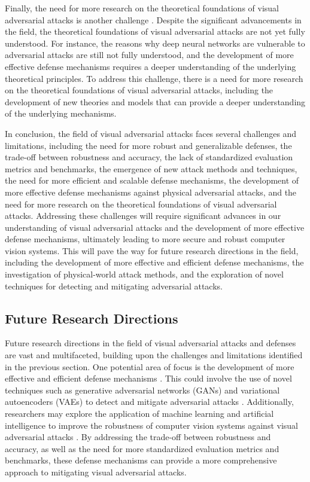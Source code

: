 \documentclass[11pt]{article}
\begin{document}
Finally, the need for more research on the theoretical foundations of visual adversarial attacks is another challenge \cite{ref134}. Despite the significant advancements in the field, the theoretical foundations of visual adversarial attacks are not yet fully understood. For instance, the reasons why deep neural networks are vulnerable to adversarial attacks are still not fully understood, and the development of more effective defense mechanisms requires a deeper understanding of the underlying theoretical principles. To address this challenge, there is a need for more research on the theoretical foundations of visual adversarial attacks, including the development of new theories and models that can provide a deeper understanding of the underlying mechanisms.

In conclusion, the field of visual adversarial attacks faces several challenges and limitations, including the need for more robust and generalizable defenses, the trade-off between robustness and accuracy, the lack of standardized evaluation metrics and benchmarks, the emergence of new attack methods and techniques, the need for more efficient and scalable defense mechanisms, the development of more effective defense mechanisms against physical adversarial attacks, and the need for more research on the theoretical foundations of visual adversarial attacks. Addressing these challenges will require significant advances in our understanding of visual adversarial attacks and the development of more effective defense mechanisms, ultimately leading to more secure and robust computer vision systems. This will pave the way for future research directions in the field, including the development of more effective and efficient defense mechanisms, the investigation of physical-world attack methods, and the exploration of novel techniques for detecting and mitigating adversarial attacks.

\subsection{Future Research Directions}

Future research directions in the field of visual adversarial attacks and defenses are vast and multifaceted, building upon the challenges and limitations identified in the previous section. One potential area of focus is the development of more effective and efficient defense mechanisms \cite{ref135}. This could involve the use of novel techniques such as generative adversarial networks (GANs) and variational autoencoders (VAEs) to detect and mitigate adversarial attacks \cite{ref136}. Additionally, researchers may explore the application of machine learning and artificial intelligence to improve the robustness of computer vision systems against visual adversarial attacks \cite{ref137}. By addressing the trade-off between robustness and accuracy, as well as the need for more standardized evaluation metrics and benchmarks, these defense mechanisms can provide a more comprehensive approach to mitigating visual adversarial attacks.
\end{document}
